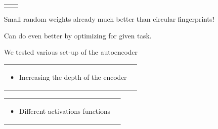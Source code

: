\documentclass[landscape,a0b,final,a4resizeable]{include/a0poster}
\begin{document}
\begin{poster}
\begin{multicols}{3}
\begin{tabular}{cc}
\begin{minipage}[c]{0.48\columnwidth}
\begin{center}
\end{center}
\end{minipage}
\end{tabular}

\vspace{0.5em}

Small random weights already much better than circular fingerprints!

Can do even better by optimizing for given task.

\vspace{1in}


We tested various set-up of the autoencoder

\begin{tabular}{cc}
\begin{minipage}[c]{0.25\columnwidth}
\begin{itemize}
\item Increasing the depth of the encoder
\end{itemize}
\end{minipage} & 
\begin{minipage}[c]{0.75\columnwidth}
\end{minipage}
\end{tabular}


\begin{tabular}{cc}
\begin{minipage}[c]{0.25\columnwidth}
\begin{itemize}
\item Different activations functions
\end{itemize}
\end{minipage} & 
\begin{minipage}[c]{0.75\columnwidth}
\end{minipage}
\end{tabular}



\end{multicols}
\end{poster}
\end{document}
